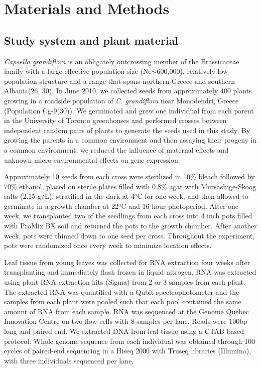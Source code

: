\section{Materials and Methods}

\subsection{Study system and plant material}
\textit{Capsella grandiflora} is an obligately outcrossing member of the Brassicaceae family with a large effective population size (Ne$\sim$600,000), relatively low population structure and a range that spans northern Greece and southern Albania(26, 30). In June 2010, we collected seeds from approximately 400 plants growing in a roadside population of \textit{C. grandiflora} near Monodendri, Greece (Population Cg-9(30)). We germinated and grew one individual from each parent in the University of Toronto greenhouses and performed crosses between independent random pairs of plants to generate the seeds used in this study. By growing the parents in a common environment and then assaying their progeny in a common environment, we reduced the influence of maternal effects and unknown micro-environmental effects on gene expression.

Approximately 10 seeds from each cross were sterilized in 10\% bleach followed by 70\% ethanol, placed on sterile plates filled with 0.8\% agar with Mursashige-Skoog salts (2.15 g/L), stratified in the dark at 4$^{o}$C for one week, and then allowed to germinate in a growth chamber at 22$^{o}$C and 16 hour photoperiod. After one week, we transplanted two of the seedlings from each cross into 4 inch pots filled with ProMix BX soil and returned the pots to the growth chamber. After another week, pots were thinned down to one seed per cross. Throughout the experiment, pots were randomized once every week to minimize location effects.

Leaf tissue from young leaves was collected for RNA extraction four weeks after transplanting and immediately flash frozen in liquid nitrogen. RNA was extracted using plant RNA extraction kits (Sigma) from 2 or 3 samples from each plant. The extracted RNA was quantified with a Qubit spectrophotometer and the samples from each plant were pooled such that each pool contained the same amount of RNA from each sample. RNA was sequenced at the Genome Quebec Innovation Centre on two flow cells with 8 samples per lane. Reads were 100bp long and paired end. We extracted DNA from leaf tissue using a CTAB based protocol. Whole genome sequence from each individual was obtained through 100 cycles of paired-end sequencing in a Hiseq 2000 with Truseq libraries (Illumina), with three individuals sequenced per lane.

